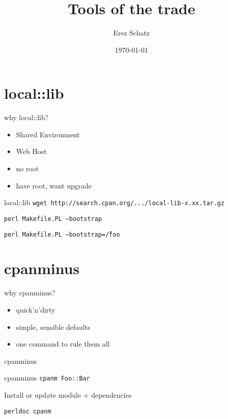 \documentclass[
	mode=present,
	style=paintings,
	size=14pt,
	paper=screen
]{powerdot}
\title{Tools of the trade}
\author{Erez Schatz}
\date {\today}
\begin{document}
\maketitle

\section{local::lib}
\begin{slide}{why local::lib?}
	\begin{itemize}
	\item Shared Environment \par \pause
	\item Web Host  \par \pause
	\item no root \par \pause
	\item have root, want upgrade
        \end{itemize}
\end{slide}
\begin{slide}{local::lib}
	\texttt{wget http://search.cpan.org/.../local-lib-x.xx.tar.gz} \par \pause
	\texttt{perl Makefile.PL --bootstrap} \par \pause
	\texttt{perl Makefile.PL --bootstrap=\~/foo}
\end{slide}
\section{cpanminus}
\begin{slide}{why cpanminus?}
        \begin{itemize}
        \item quick'n'dirty \par \pause
        \item simple, sensible defaults \par \pause
        \item one command to rule them all
        \end{itemize}
\end{slide}
\begin{slide}{cpanminus}
	\par \pause
         \par \pause

\end{slide}
\begin{slide}{cpanminus}
        \texttt{cpanm Foo::Bar} \par \pause
        Install or update module + dependencies \par
        \texttt{perldoc cpanm}
\end{slide}
\end{document}
